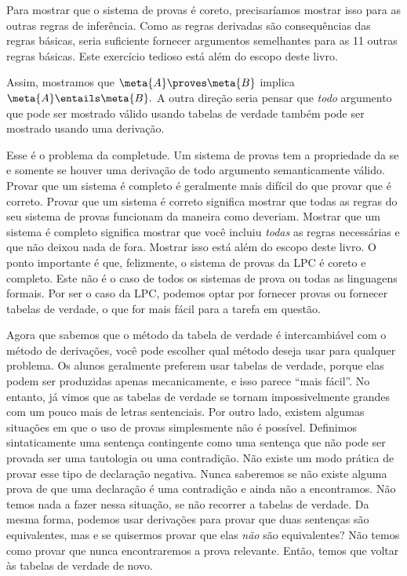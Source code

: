 Para mostrar que o sistema de provas é coreto, precisaríamos mostrar isso para as outras regras de inferência. Como as regras derivadas são consequências das regras básicas, seria suficiente fornecer argumentos semelhantes para as 11 outras regras básicas. Este exercício tedioso está além do escopo deste livro.


Assim, mostramos que $\meta{A} \proves  \meta{B}$ implica $\meta{A} \entails \meta{B}.$ A outra direção seria pensar que \emph{todo} argumento que pode ser mostrado válido usando tabelas de verdade também pode ser mostrado usando uma derivação.

Esse é o problema da completude. Um sistema de provas tem a propriedade da    \label{def:completeness} se e somente se houver uma derivação de todo argumento semanticamente válido. Provar que um sistema é completo é geralmente mais difícil do que provar que é correto. Provar que um sistema é correto significa mostrar que todas as regras do seu sistema de provas funcionam da maneira como deveriam.
Mostrar que um sistema é completo significa mostrar que você incluiu \emph{todas} as regras necessárias e que não deixou nada de fora. Mostrar isso está além do escopo deste livro. O ponto importante é que, felizmente, o sistema de provas da LPC é coreto e completo. Este não é o caso de todos os sistemas de prova ou todas as linguagens formais. Por ser o caso da LPC, podemos optar por fornecer provas ou fornecer tabelas de verdade, o que for mais fácil para a tarefa em questão.

Agora que sabemos que o método da tabela de verdade é intercambiável com o método de derivações, você pode escolher qual método deseja usar para qualquer problema. Os alunos geralmente preferem usar tabelas de verdade, porque elas podem ser produzidas apenas mecanicamente, e isso parece ``mais fácil''. No entanto, já vimos que as tabelas de verdade se tornam impossivelmente grandes com um pouco mais de letras sentenciais.
Por outro lado, existem algumas situações em que o uso de provas simplesmente não é possível. Definimos sintaticamente uma sentença contingente como uma sentença que não pode ser provada ser uma tautologia ou uma contradição. Não existe um modo prática de provar esse tipo de declaração negativa. Nunca saberemos se não existe alguma prova de que uma declaração é uma contradição e ainda não a encontramos. Não temos nada a fazer nessa situação, se não recorrer a tabelas de verdade. Da mesma forma, podemos usar derivações para provar que duas sentenças são equivalentes, mas e se quisermos provar que elas \emph{não} são equivalentes? Não temos como provar que nunca encontraremos a prova relevante. Então, temos que voltar às tabelas de verdade de novo.

